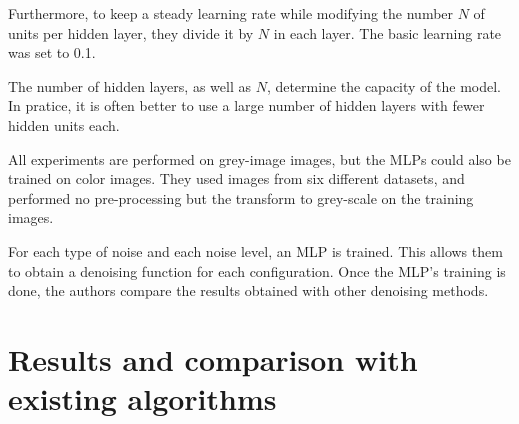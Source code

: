 \documentclass[10pt,a4paper]{article}
\newcommand{\svs}{\vspace{9pt}}
\begin{document}
\svs

Furthermore, to keep a steady learning rate while modifying the number $N$ of units per hidden layer, they divide it by $N$ in each layer. The basic learning rate was set to 0.1. 

\svs

The number of hidden layers, as well as $N$, determine the capacity of the model. In pratice, it is often better to use a large number of hidden layers with fewer hidden units each.

\svs

All experiments are performed on grey-image images, but the MLPs could also be trained on color images. They used images from six different datasets, and performed no pre-processing but the transform to grey-scale on the training images. 

\svs 

For each type of noise and each noise level, an MLP is trained. This allows them to obtain a
denoising function for each configuration.
Once the MLP's training is done, the authors compare the results obtained with other denoising methods.




\svs

\section{Results and comparison with existing algorithms}

\end{document}
